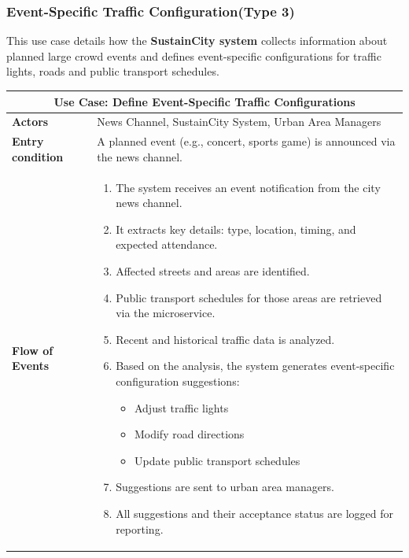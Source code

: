 \documentclass[11.5pt]{article}
\begin{document}
    \newpage
    
    \subsubsection{Event-Specific Traffic Configuration(Type 3)}
    This use case details how the \textbf{SustainCity system} collects information about planned large crowd events and defines event-specific configurations for traffic lights, roads and public transport schedules. 

    \begin{table}[H]
        \centering
        \begin{tabular}{@{} l p{23em} @{}}
            \toprule \multicolumn{2}{c}{Use Case: \textbf{Define Event-Specific Traffic Configurations}} \\
            \midrule   
            \textbf{Actors} & News Channel, SustainCity System, Urban Area Managers \\
            \textbf{Entry condition} & A planned event (e.g., concert, sports game) is announced via the news channel. \\
            \textbf{Flow of Events} & 
            \begin{enumerate}[left=0pt, parsep=0pt, topsep=0pt]
              \item The system receives an event notification from the city news channel.
              \item It extracts key details: type, location, timing, and expected attendance.
              \item Affected streets and areas are identified.
              \item Public transport schedules for those areas are retrieved via the microservice.
              \item Recent and historical traffic data is analyzed.
              \item Based on the analysis, the system generates event-specific configuration suggestions:
              \begin{itemize}
                \item Adjust traffic lights
                \item Modify road directions
                \item Update public transport schedules
              \end{itemize}
              \item Suggestions are sent to urban area managers.
              \item All suggestions and their acceptance status are logged for reporting.

\end{enumerate}
\end{tabular}
\end{table}
\end{document}
